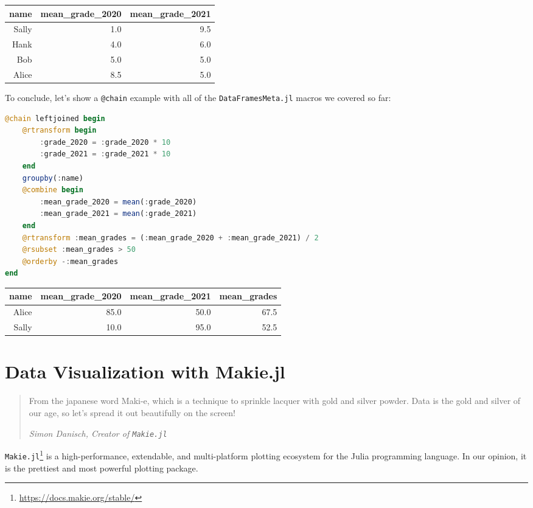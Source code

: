 \documentclass[
  notoc %
]{tufte-book}
\DeclareRobustCommand{\href}[2]{#2\footnote{\url{#1}}}
\newcommand{\passthrough}[1]{#1}
\begin{document}
\begin{longtable}[]{@{}rrr@{}}
\toprule
name & mean\_grade\_2020 & mean\_grade\_2021 \\
\midrule
\endhead
Sally & 1.0 & 9.5 \\
Hank & 4.0 & 6.0 \\
Bob & 5.0 & 5.0 \\
Alice & 8.5 & 5.0 \\
\bottomrule
\end{longtable}

To conclude, let's show a \passthrough{\lstinline!@chain!} example with
all of the \passthrough{\lstinline!DataFramesMeta.jl!} macros we covered
so far:

\begin{lstlisting}[language=Julia]
@chain leftjoined begin
    @rtransform begin
        :grade_2020 = :grade_2020 * 10
        :grade_2021 = :grade_2021 * 10
    end
    groupby(:name)
    @combine begin
        :mean_grade_2020 = mean(:grade_2020)
        :mean_grade_2021 = mean(:grade_2021)
    end
    @rtransform :mean_grades = (:mean_grade_2020 + :mean_grade_2021) / 2
    @rsubset :mean_grades > 50
    @orderby -:mean_grades
end
\end{lstlisting}

\begin{longtable}[]{@{}rrrr@{}}
\toprule
name & mean\_grade\_2020 & mean\_grade\_2021 & mean\_grades \\
\midrule
\endhead
Alice & 85.0 & 50.0 & 67.5 \\
Sally & 10.0 & 95.0 & 52.5 \\
\bottomrule
\end{longtable}

\hypertarget{sec:DataVisualizationMakie}{%
\chapter{Data Visualization with
Makie.jl}\label{sec:DataVisualizationMakie}}

\begin{quote}
From the japanese word Maki-e, which is a technique to sprinkle lacquer
with gold and silver powder. Data is the gold and silver of our age, so
let's spread it out beautifully on the screen!

\emph{Simon Danisch, Creator of \passthrough{\lstinline!Makie.jl!}}
\end{quote}

\href{https://docs.makie.org/stable/}{\passthrough{\lstinline!Makie.jl!}}
is a high-performance, extendable, and multi-platform plotting ecosystem
for the Julia programming language. In our opinion, it is the prettiest
and most powerful plotting package.
\end{document}
